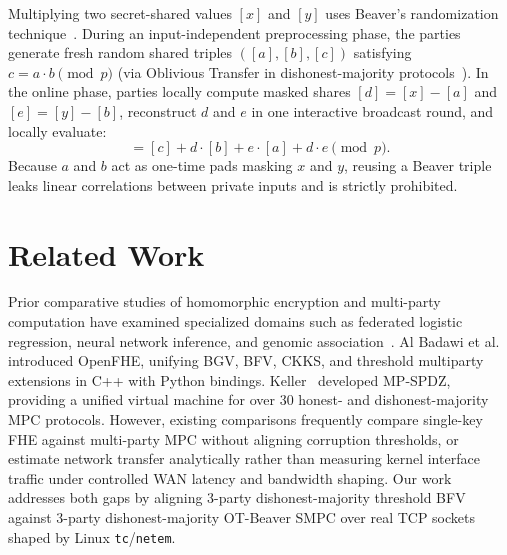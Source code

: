 \documentclass[conference]{IEEEtran}
\begin{document}
Multiplying two secret-shared values $[x]$ and $[y]$ uses Beaver's randomization technique~\cite{beaver1991}. During an input-independent preprocessing phase, the parties generate fresh random shared triples $([a], [b], [c])$ satisfying $c = a \cdot b \pmod p$ (via Oblivious Transfer in dishonest-majority protocols~\cite{mascot2016}). In the online phase, parties locally compute masked shares $[d] = [x] - [a]$ and $[e] = [y] - [b]$, reconstruct $d$ and $e$ in one interactive broadcast round, and locally evaluate:
\begin{equation}
[x \cdot y] = [c] + d \cdot [b] + e \cdot [a] + d \cdot e \pmod p.
\end{equation}
Because $a$ and $b$ act as one-time pads masking $x$ and $y$, reusing a Beaver triple leaks linear correlations between private inputs and is strictly prohibited.

\section{Related Work}
Prior comparative studies of homomorphic encryption and multi-party computation have examined specialized domains such as federated logistic regression, neural network inference, and genomic association~\cite{openfhe2022,mpspdz2020,mouchet2021}. Al Badawi et al.~\cite{openfhe2022} introduced OpenFHE, unifying BGV, BFV, CKKS, and threshold multiparty extensions in C++ with Python bindings. Keller~\cite{mpspdz2020} developed MP-SPDZ, providing a unified virtual machine for over 30 honest- and dishonest-majority MPC protocols. However, existing comparisons frequently compare single-key FHE against multi-party MPC without aligning corruption thresholds, or estimate network transfer analytically rather than measuring kernel interface traffic under controlled WAN latency and bandwidth shaping. Our work addresses both gaps by aligning 3-party dishonest-majority threshold BFV against 3-party dishonest-majority OT-Beaver SMPC over real TCP sockets shaped by Linux \texttt{tc}/\texttt{netem}.
\end{document}
